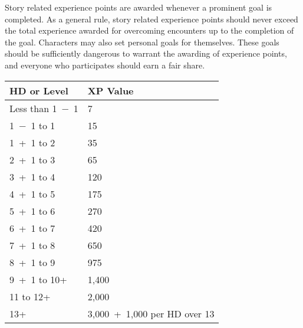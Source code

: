 \begin{multicols}{2}
Story related experience points are awarded whenever a prominent goal is completed.  As a general rule, story related experience points should never exceed the total experience awarded for overcoming encounters up to the completion of the goal.  Characters may also set personal goals for themselves. These goals should be sufficiently dangerous to warrant the awarding of experience points, and everyone who participates should earn a fair share.

\noindent
\begin{minipage}{\columnwidth}

\label{creaturexp}
\noindent
\begin{tabular}{|p{}|p{}|}
\hline
HD or Level		& XP Value \\
\hline\hline
\rowcolor[gray]{.9}Less than 1~$-$~1	& 7 \\
1~$-$~1 to 1		& 15 \\
\rowcolor[gray]{.9}1~+~1 to 2		& 35 \\
2~+~1 to 3		& 65 \\
\rowcolor[gray]{.9}3~+~1 to 4		& 120 \\
4~+~1 to 5		& 175 \\
\rowcolor[gray]{.9}5~+~1 to 6		& 270 \\
6~+~1 to 7		& 420 \\
\rowcolor[gray]{.9}7~+~1 to 8		& 650 \\
8~+~1 to 9		& 975 \\
\rowcolor[gray]{.9}9~+~1 to 10+	& 1,400 \\
11 to 12+		& 2,000 \\
\rowcolor[gray]{.9}13+				& 3,000~+~1,000 per HD over 13 \\
\hline
\end{tabular}

\end{minipage}

\noindent
\begin{minipage}{\columnwidth}


\end{minipage}
\end{multicols}
